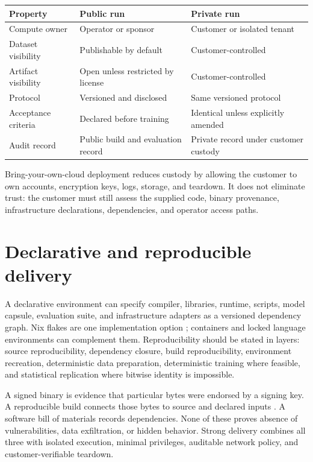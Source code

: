 \documentclass[11pt]{article}
\begin{document}
\begin{longtable}{L{3cm}L{5cm}L{5.5cm}}
\toprule
\textbf{Property} & \textbf{Public run} & \textbf{Private run} \\
\midrule
\endhead
Compute owner & Operator or sponsor & Customer or isolated tenant \\
Dataset visibility & Publishable by default & Customer-controlled \\
Artifact visibility & Open unless restricted by license & Customer-controlled \\
Protocol & Versioned and disclosed & Same versioned protocol \\
Acceptance criteria & Declared before training & Identical unless explicitly amended \\
Audit record & Public build and evaluation record & Private record under customer custody \\
\bottomrule
\end{longtable}

Bring-your-own-cloud deployment reduces custody by allowing the customer to own accounts, encryption keys, logs, storage, and teardown. It does not eliminate trust: the customer must still assess the supplied code, binary provenance, infrastructure declarations, dependencies, and operator access paths.

\section{Declarative and reproducible delivery}
A declarative environment can specify compiler, libraries, runtime, scripts, model capsule, evaluation suite, and infrastructure adapters as a versioned dependency graph. Nix flakes are one implementation option \cite{guix2015}; containers and locked language environments can complement them. Reproducibility should be stated in layers: source reproducibility, dependency closure, build reproducibility, environment recreation, deterministic data preparation, deterministic training where feasible, and statistical replication where bitwise identity is impossible.

A signed binary is evidence that particular bytes were endorsed by a signing key. A reproducible build connects those bytes to source and declared inputs \cite{reprobuilds}. A software bill of materials records dependencies. None of these proves absence of vulnerabilities, data exfiltration, or hidden behavior. Strong delivery combines all three with isolated execution, minimal privileges, auditable network policy, and customer-verifiable teardown.
\end{document}
